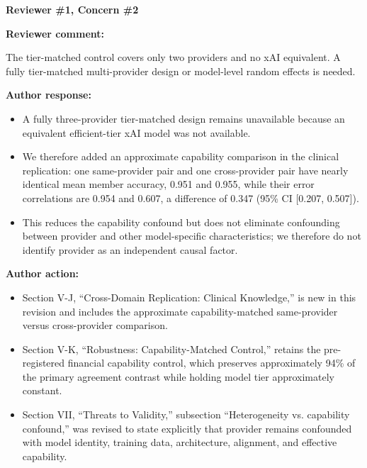 \documentclass[11pt]{article}
\newcommand{\rvcomment}[1]{{\color{ReviewerGreen}#1}}
\newcommand{\concern}[1]{\textbf{\color{ReviewerGreen}#1}}
\begin{document}
\vspace{12pt}
\concern{Reviewer \#1, Concern \#2}

\concern{Reviewer comment:}

\rvcomment{The tier-matched control covers only two providers and no xAI equivalent. A fully tier-matched multi-provider design or model-level random effects is needed.}

\textbf{Author response:}

\begin{itemize}

\item A fully three-provider tier-matched design remains unavailable because an equivalent efficient-tier xAI model was not available.

\item We therefore added an approximate capability comparison in the clinical replication: one same-provider pair and one cross-provider pair have nearly identical mean member accuracy, 0.951 and 0.955, while their error correlations are 0.954 and 0.607, a difference of 0.347 (95\% CI [0.207, 0.507]).

\item This reduces the capability confound but does not eliminate confounding between provider and other model-specific characteristics; we therefore do not identify provider as an independent causal factor.

\end{itemize}

\textbf{Author action:}

\begin{itemize}

\item Section V-J, ``Cross-Domain Replication: Clinical Knowledge,'' is new in this revision and includes the approximate capability-matched same-provider versus cross-provider comparison.

\item Section V-K, ``Robustness: Capability-Matched Control,'' retains the pre-registered financial capability control, which preserves approximately 94\% of the primary agreement contrast while holding model tier approximately constant.

\item Section VII, ``Threats to Validity,'' subsection ``Heterogeneity vs. capability confound,'' was revised to state explicitly that provider remains confounded with model identity, training data, architecture, alignment, and effective capability.

\end{itemize}
\end{document}
